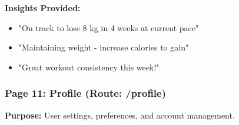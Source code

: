 \documentclass[12pt,a4paper]{article}
\begin{document}
\textbf{Insights Provided:}
\begin{itemize}[noitemsep, topsep=2pt]
  \item "On track to lose 8 kg in 4 weeks at current pace"
  \item "Maintaining weight - increase calories to gain"
  \item "Great workout consistency this week!"
\end{itemize}

\vspace{0.5cm}
\noindent{}
\vspace{1cm}


\subsubsection*{Page 11: Profile (Route: /profile)}

\textbf{Purpose:} User settings, preferences, and account management.
\end{document}
